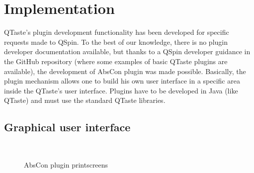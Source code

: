 \section{Implementation}

\label{sec:abscon:architecture}

QTaste's plugin development functionality has been developed for specific requests made to QSpin. To the best of our knowledge, there is no plugin developer documentation available, but thanks to a QSpin developer guidance in the GitHub repository (where some examples of basic QTaste plugins are available), the development of AbsCon plugin was made possible. Basically, the plugin mechanism allows one to build his own user interface in a specific area inside the QTaste's user interface. Plugins have to be developed in Java (like QTaste) and must use the standard QTaste libraries. 

\subsection{Graphical user interface}

\begin{figure*}[t]
	\centering
	\\
	\hspace{5pt}
	\caption{AbsCon plugin printscreens}
	\label{fig:printscreen}
\end{figure*}

